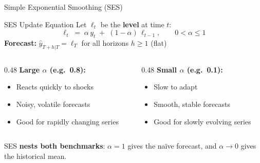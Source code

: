 \documentclass[aspectratio=169, 11pt]{beamer}
\begin{document}
\begin{frame}{Simple Exponential Smoothing (SES)}
  \begin{definitionbox}{SES Update Equation}
    Let $\ell_t$ be the \textbf{level} at time $t$:
    \[
      \ell_t \;=\; \alpha\, y_t \;+\; (1-\alpha)\,\ell_{t-1},
      \qquad 0 < \alpha \leq 1
    \]
    \textbf{Forecast:} $\hat{y}_{T+h|T} = \ell_T$ for all horizons $h \geq 1$ (flat)
  \end{definitionbox}
  \begin{columns}[T]
    \begin{column}{0.48\textwidth}
      \textbf{Large $\alpha$ (e.g.\ 0.8):}
      \begin{itemize}\small\itemsep0pt
        \item Reacts quickly to shocks
        \item Noisy, volatile forecasts
        \item Good for rapidly changing series
      \end{itemize}
    \end{column}
    \begin{column}{0.48\textwidth}
      \textbf{Small $\alpha$ (e.g.\ 0.1):}
      \begin{itemize}\small\itemsep0pt
        \item Slow to adapt
        \item Smooth, stable forecasts
        \item Good for slowly evolving series
      \end{itemize}
    \end{column}
  \end{columns}
  \vspace{0.2cm}
  SES \textbf{nests both benchmarks}: $\alpha = 1$ gives the na\"{i}ve forecast,
  and $\alpha \to 0$ gives the historical mean.
\end{frame}
\end{document}
